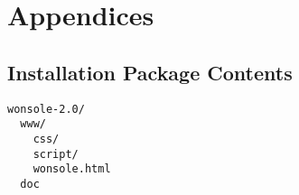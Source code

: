

\section{Appendices}
\subsection{Installation Package Contents}
\begin{verbatim}
wonsole-2.0/
  www/
    css/
    script/
    wonsole.html
  doc
\end{verbatim}


